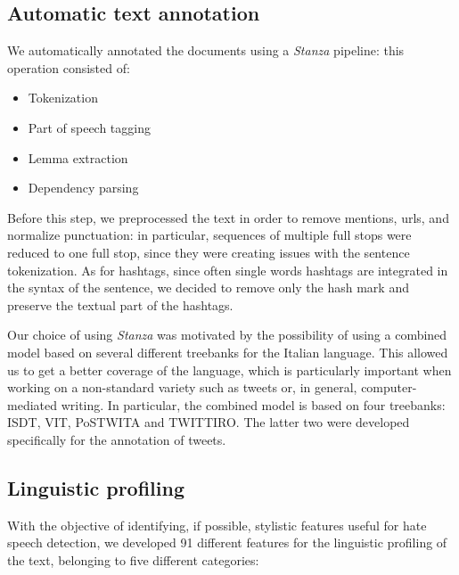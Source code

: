 \subsection{Automatic text annotation}
We automatically annotated the documents using a \emph{Stanza} \cite{stanza} pipeline: this operation consisted of:
\begin{itemize}
    \item Tokenization
    \item Part of speech tagging
    \item Lemma extraction
    \item Dependency parsing
\end{itemize}

Before this step, we preprocessed the text in order to remove mentions, urls, and normalize punctuation: in particular, sequences of multiple full stops were reduced to one full stop, since they were creating issues with the sentence tokenization.
As for hashtags, since often single words hashtags are integrated in the syntax of the sentence, we decided to remove only the hash mark and preserve the textual part of the hashtags.

Our choice of using \emph{Stanza} was motivated by the possibility of using a combined model based on several different treebanks for the Italian language.
This allowed us to get a better coverage of the language, which is particularly important when working on a non-standard variety such as tweets or, in general, computer-mediated writing.
In particular, the combined model is based on four treebanks: ISDT, VIT, PoSTWITA and TWITTIRO. The latter two were developed specifically for the annotation of tweets.

\subsection{Linguistic profiling}
With the objective of identifying, if possible, stylistic features useful for hate speech detection, we developed 91 different features for the linguistic profiling of the text, belonging to five different categories:

